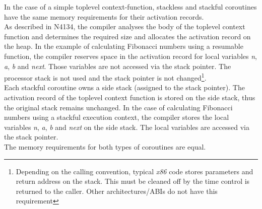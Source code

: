 In the case of a simple toplevel context-function, stackless and stackful coroutines
have the same memory requirements for their activation records.\\
\newline
As described in N4134, the compiler analyses the body of the toplevel context
function and determines the required size and allocates the activation record on
the heap.
In the example of calculating Fibonacci numbers using a resumable function, the
compiler reserves space in the activation record for local variables \emph{n},
\emph{a}, \emph{b} and \emph{next}. Those variables are not accessed via the
stack pointer. The processor stack is not used and the stack pointer is not
changed\footnote{Depending on the calling convention, typical \emph{x86} code
stores parameters and return address on the stack. This must be cleaned off by
the time control is returned to the caller. Other architectures/ABIs do
not have this requirement}.\\
\newline
Each stackful coroutine owns a side stack (assigned to the stack pointer). The
activation record of the toplevel context function is stored on the side
stack, thus the original stack remains unchanged.
In the case of calculating Fibonacci numbers using a stackful execution
context, the compiler stores the local variables \emph{n}, \emph{a},
\emph{b} and \emph{next} on the side stack. The local variables are accessed
via the stack pointer.\\
\newline
The memory requirements for both types of coroutines are equal.

